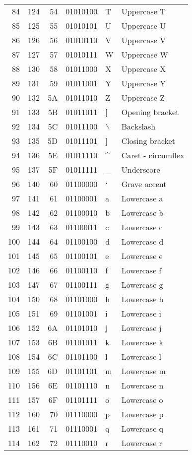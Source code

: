 \documentclass[11pt]{article}
\begin{document}
\begin{longtable}{rrrrll}
84 & 124 & 54 & 01010100 & T & Uppercase T\\
85 & 125 & 55 & 01010101 & U & Uppercase U\\
86 & 126 & 56 & 01010110 & V & Uppercase V\\
87 & 127 & 57 & 01010111 & W & Uppercase W\\
88 & 130 & 58 & 01011000 & X & Uppercase X\\
89 & 131 & 59 & 01011001 & Y & Uppercase Y\\
90 & 132 & 5A & 01011010 & Z & Uppercase Z\\
91 & 133 & 5B & 01011011 & {[} & Opening bracket\\
92 & 134 & 5C & 01011100 & $\backslash$ & Backslash\\
93 & 135 & 5D & 01011101 & ] & Closing bracket\\
94 & 136 & 5E & 01011110 & \^{} & Caret - circumflex\\
95 & 137 & 5F & 01011111 & \_ & Underscore\\
96 & 140 & 60 & 01100000 & ` & Grave accent\\
97 & 141 & 61 & 01100001 & a & Lowercase a\\
98 & 142 & 62 & 01100010 & b & Lowercase b\\
99 & 143 & 63 & 01100011 & c & Lowercase c\\
100 & 144 & 64 & 01100100 & d & Lowercase d\\
101 & 145 & 65 & 01100101 & e & Lowercase e\\
102 & 146 & 66 & 01100110 & f & Lowercase f\\
103 & 147 & 67 & 01100111 & g & Lowercase g\\
104 & 150 & 68 & 01101000 & h & Lowercase h\\
105 & 151 & 69 & 01101001 & i & Lowercase i\\
106 & 152 & 6A & 01101010 & j & Lowercase j\\
107 & 153 & 6B & 01101011 & k & Lowercase k\\
108 & 154 & 6C & 01101100 & l & Lowercase l\\
109 & 155 & 6D & 01101101 & m & Lowercase m\\
110 & 156 & 6E & 01101110 & n & Lowercase n\\
111 & 157 & 6F & 01101111 & o & Lowercase o\\
112 & 160 & 70 & 01110000 & p & Lowercase p\\
113 & 161 & 71 & 01110001 & q & Lowercase q\\
114 & 162 & 72 & 01110010 & r & Lowercase r\\

\end{longtable}
\end{document}
